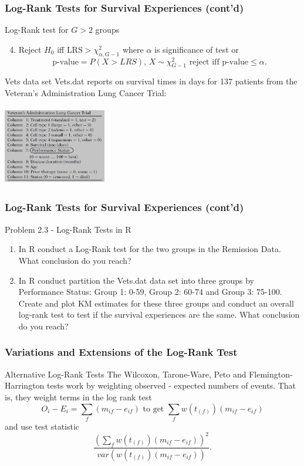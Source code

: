 \documentclass{beamer}
\theoremstyle{definition}
\begin{document}
\begin{frame}
\frametitle{Log-Rank Tests for Survival Experiences (cont'd)}
\begin{block}{Log-Rank test for $G>2$ groups}
\begin{enumerate}
\setcounter{enumi}{3}
\item Reject $H_0$ iff $\text{LRS} > \chi^2_{\alpha,G-1}$ where $\alpha$ is significance of test or
\[
\text{p-value} = P(X>LRS), \,  X \sim \chi^2_{G-1} \text{ reject iff p-value} \le \alpha.
\]
\end{enumerate}
\end{block}
\begin{block}{Vets data set}
Vets.dat reports on survival times in days for 137 patients from the Veteran’s Administration Lung Cancer Trial:
\begin{center}
\includegraphics[width =4.5cm, height=3.5cm]{CH2_Vets}
\end{center}
\end{block}
\end{frame}
\begin{frame}
\frametitle{Log-Rank Tests for Survival Experiences (cont'd)}
\begin{block}{Problem 2.3 - Log-Rank Tests in R}
\begin{enumerate}
\item In R conduct a Log-Rank test for the two groups in the Remission Data. What conclusion do you reach?
\item In R conduct partition the Vets.dat data set into three groups by Performance Status: Group 1: 0-59, Group 2: 60-74 and Group 3: 75-100. Create and plot KM estimates for these three groups and conduct an overall log-rank test to test if the survival experiences are the same. What conclusion do you reach?
\end{enumerate}
\end{block}
\end{frame}
\begin{frame}
\frametitle{Variations and Extensions of the Log-Rank Test}
\begin{block}{Alternative Log-Rank Tests}
The Wilcoxon, Tarone-Ware, Peto and Flemington-Harrington tests work by weighting observed - expected numbers of events. That is, they weight terms in the log rank test
\[
O_i - E_i = \sum_f (m_{if}-e_{if}) \text{ to get } \sum_f w(t_{(f)})(m_{if}-e_{if})
\]
and use test statistic
\[
\frac{\left(\sum_f w(t_{(f)}) (m_{if}-e_{if})\right)^2}{var(w(t_{(f)}) (m_{if}-e_{if}))}.
\]
\end{block}
\end{frame}
\end{document}
